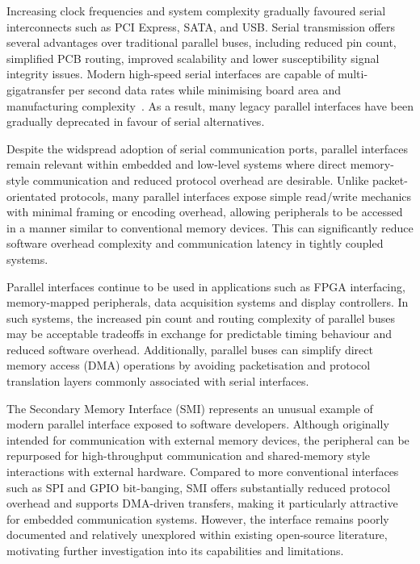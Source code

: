 \documentclass[final]{cmpreport}
\begin{document}
Increasing clock frequencies and system complexity gradually favoured serial interconnects such as PCI Express, SATA, and USB. Serial transmission offers several advantages over traditional parallel buses, including reduced pin count, simplified PCB routing, improved scalability and lower susceptibility signal integrity issues. Modern high-speed serial interfaces are capable of multi-gigatransfer per second data rates while minimising board area and manufacturing complexity~\cite{zotero-item-18}. As a result, many legacy parallel interfaces have been gradually deprecated in favour of serial alternatives.

Despite the widspread adoption of serial communication ports, parallel interfaces remain relevant within embedded and low-level systems where direct memory-style communication and reduced protocol overhead are desirable. Unlike packet-orientated protocols, many parallel interfaces expose simple read/write mechanics with minimal framing or encoding overhead, allowing peripherals to be accessed in a manner similar to conventional memory devices. This can significantly reduce software overhead complexity and communication latency in tightly coupled systems.

Parallel interfaces continue to be used in applications such as FPGA interfacing, memory-mapped peripherals, data acquisition systems and display controllers. In such systems, the increased pin count and routing complexity of parallel buses may be acceptable tradeoffs in exchange for predictable timing behaviour and reduced software overhead. Additionally, parallel buses can simplify direct memory access (DMA) operations by avoiding packetisation and protocol translation layers commonly associated with serial interfaces.

The Secondary Memory Interface (SMI) represents an unusual example of modern parallel interface exposed to software developers. Although originally intended for communication with external memory devices, the peripheral can be repurposed for high-throughput communication and shared-memory style interactions with external hardware. Compared to more conventional interfaces such as SPI and GPIO bit-banging, SMI offers substantially reduced protocol overhead and supports DMA-driven transfers, making it particularly attractive for embedded communication systems. However, the interface remains poorly documented and relatively unexplored within existing open-source literature, motivating further investigation into its capabilities and limitations.
\end{document}
